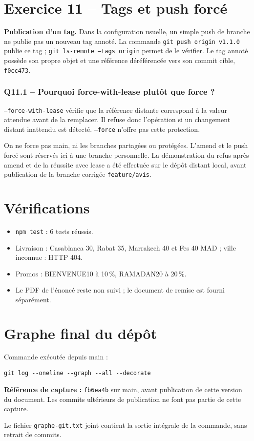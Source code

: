 \documentclass[10pt,a4paper]{article}
\newcommand{\question}[1]{\subsubsection*{#1}}
\begin{document}
\section*{Exercice 11 -- Tags et push forcé}
\textbf{Publication d'un tag.} Dans la configuration usuelle, un simple push de branche ne publie pas un nouveau tag annoté. La commande \texttt{git push origin v1.1.0} publie ce tag ; \texttt{git ls-remote --tags origin} permet de le vérifier. Le tag annoté possède son propre objet et une référence déréférencée vers son commit cible, \texttt{f0cc473}.

\question{Q11.1 -- Pourquoi force-with-lease plutôt que force ?}
\texttt{--force-with-lease} vérifie que la référence distante correspond à la valeur attendue avant de la remplacer. Il refuse donc l'opération si un changement distant inattendu est détecté. \texttt{--force} n'offre pas cette protection.

On ne force pas main, ni les branches partagées ou protégées. L'amend et le push forcé sont réservés ici à une branche personnelle. La démonstration du refus après amend et de la réussite avec lease a été effectuée sur le dépôt distant local, avant publication de la branche corrigée \texttt{feature/avis}.

\section*{Vérifications}
\begin{itemize}
\item \texttt{npm test} : 6 tests réussis.
\item Livraison : Casablanca 30, Rabat 35, Marrakech 40 et Fes 40 MAD ; ville inconnue : HTTP 404.
\item Promos : BIENVENUE10 à 10\,\%, RAMADAN20 à 20\,\%.
\item Le PDF de l'énoncé reste non suivi ; le document de remise est fourni séparément.
\end{itemize}

\newpage
\section*{Graphe final du dépôt}
Commande exécutée depuis main :
\begin{tcolorbox}[colback=Light,colframe=Border,boxrule=.4pt,arc=0pt,left=3mm,right=3mm,top=2mm,bottom=2mm]
\begin{Verbatim}[fontsize=\small]
git log --oneline --graph --all --decorate
\end{Verbatim}
\end{tcolorbox}
\textbf{Référence de capture :} \texttt{fb6ea4b} sur main, avant publication de cette version du document. Les commits ultérieurs de publication ne font pas partie de cette capture.\par
Le fichier \texttt{graphe-git.txt} joint contient la sortie intégrale de la commande, sans retrait de commits.
\begin{tcolorbox}[colback=Light,colframe=Border,boxrule=.4pt,arc=0pt,left=3mm,right=3mm,top=3mm,bottom=3mm]
\begingroup
\setlength{\parskip}{0pt}
\endgroup
\end{tcolorbox}
\end{document}
